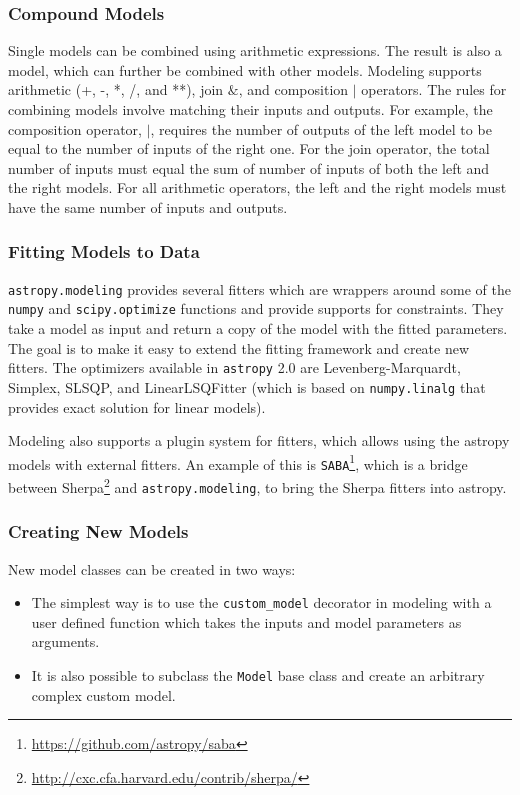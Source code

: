 \documentclass[modern]{aastex61}
\newcommand{\package}[1]{\texttt{#1}\xspace}
\newcommand{\astropypkg}{\package{astropy}}
\begin{document}
\subsubsection{Compound Models}
Single models can be combined using arithmetic expressions. The result is also a model, which can further be combined with other models. Modeling supports arithmetic (+, -, *, /, and **), join $\&$, and composition $|$ operators. The rules for combining models involve matching their inputs and outputs. For example, the composition operator, $|$, requires the number of outputs of the left model to be equal to the number of inputs of the right one. For the join operator, the total number of inputs must equal the sum of number of inputs of both the left and the right models. For all arithmetic operators, the left and the right models must have the same number of inputs and outputs.

\subsubsection{Fitting Models to Data}

\package{astropy.modeling} provides several fitters which are wrappers around some of the \texttt{numpy} and \texttt{scipy.optimize} functions and provide supports for constraints. They take a model as input and return a copy of the model with the fitted parameters. The goal is to make it easy to extend the fitting framework and create new fitters. The optimizers available in \astropypkg 2.0 are Levenberg-Marquardt, Simplex, SLSQP, and LinearLSQFitter (which is based on \texttt{numpy.linalg} that provides exact solution for linear models).

Modeling also supports a plugin system for fitters, which allows using the
astropy models with external fitters. An example of this is
\package{SABA}\footnote{\url{https://github.com/astropy/saba}}, which is a bridge between
Sherpa\footnote{\url{http://cxc.cfa.harvard.edu/contrib/sherpa/}}
and \package{astropy.modeling}, to bring the Sherpa fitters into astropy.

\subsubsection{Creating New Models}

New model classes can be created in two ways:
\begin{itemize}
   \item The simplest way is to use the \texttt{custom\_model} decorator in modeling with a user defined function which takes the inputs and model parameters as arguments.
   \item It is also possible to subclass the \texttt{Model} base class and create an arbitrary complex custom model.
\end{itemize}
\end{document}
